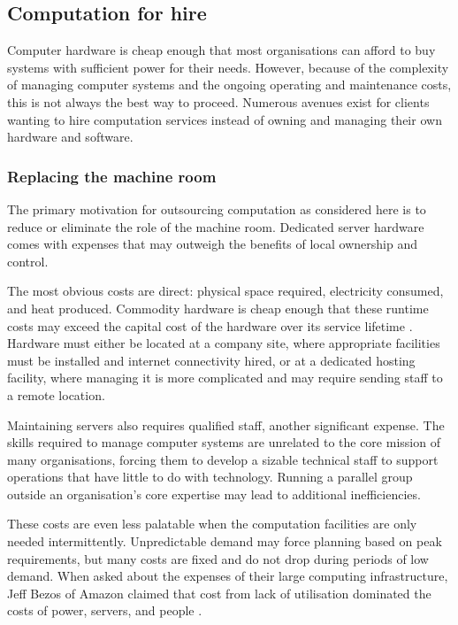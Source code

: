 \subsection{Computation for hire}

Computer hardware is cheap enough that most organisations can afford to buy systems with sufficient power for their needs. However, because of the complexity of managing computer systems and the ongoing operating and maintenance costs, this is not always the best way to proceed. Numerous avenues exist for clients wanting to hire computation services instead of owning and managing their own hardware and software.

\subsubsection{Replacing the machine room}

The primary motivation for outsourcing computation as considered here is to reduce or eliminate the role of the machine room. Dedicated server hardware comes with expenses that may outweigh the benefits of local ownership and control.

The most obvious costs are direct: physical space required, electricity consumed, and heat produced. Commodity hardware is cheap enough that these runtime costs may exceed the capital cost of the hardware over its service lifetime \cite{barroso05}. Hardware must either be located at a company site, where appropriate facilities must be installed and internet connectivity hired, or at a dedicated hosting facility, where managing it is more complicated and may require sending staff to a remote location.

Maintaining servers also requires qualified staff, another significant expense. The skills required to manage computer systems are unrelated to the core mission of many organisations, forcing them to develop a sizable technical staff to support operations that have little to do with technology. Running a parallel group outside an organisation's core expertise may lead to additional inefficiencies.

These costs are even less palatable when the computation facilities are only needed intermittently. Unpredictable demand may force planning based on peak requirements, but many costs are fixed and do not drop during periods of low demand. When asked about the expenses of their large computing infrastructure, Jeff Bezos of Amazon claimed that cost from lack of utilisation dominated the costs of power, servers, and people \cite{bezos}.

